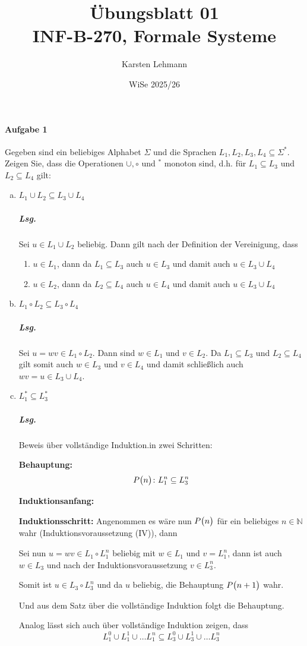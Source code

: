 \documentclass{scrreprt}
\author{Karsten Lehmann}
\date{WiSe 2025/26}
\title{Übungsblatt 01\\INF-B-270, Formale Systeme}
\begin{document}
\paragraph{Aufgabe 1}
Gegeben sind ein beliebiges Alphabet $\Sigma$ und die Sprachen
$L_1, L_2, L_3, L_4 \subseteq \Sigma^*$.
Zeigen Sie, dass die Operationen $\cup, \circ$ und $^*$ monoton sind, d.h.
für $L_1 \subseteq L_3$ und $L_2 \subseteq L_4$ gilt:
\begin{enumerate}[(a)]
\item $L_1 \cup L_2 \subseteq L_3 \cup L_4$

  \subparagraph{Lsg.} Sei $u \in L_1 \cup L_2$ beliebig.
  Dann gilt nach der Definition der Vereinigung, dass
  \begin{enumerate}[(1)]
  \item $u \in L_1$, dann da $L_1 \subseteq L_3$ auch $u \in L_3$ und damit
    auch $u \in L_3 \cup L_4$
  \item $u \in L_2$, dann da $L_2 \subseteq L_4$ auch $u \in L_4$ und damit
    auch $u \in L_3 \cup L_4$
  \end{enumerate}

\item $L_1 \circ L_2 \subseteq L_3 \circ L_4$

  \subparagraph{Lsg.} Sei $u = wv \in L_1 \circ L_2$.
  Dann sind $w \in L_1$ und $v \in L_2$.
  Da $L_1 \subseteq L_3$ und $L_2 \subseteq L_4$ gilt somit auch
  $w \in L_3$ und $v \in L_4$ und damit schließlich auch
  $wv = u \in L_3 \cup L_4$.
\item $L_1^* \subseteq L_3^*$

  \subparagraph{Lsg.} Beweis über vollständige Induktion.in zwei Schritten:

  \textbf{Behauptung:}
  \[
    P\qty\big(n) \colon L_1^n  \subseteq L_3^n
  \]

  \textbf{Induktionsanfang:}

  \textbf{Induktionsschritt:} Angenommen es wäre nun $P\qty\big(n)$ für ein
  beliebiges $n \in \mathbb{N}$ wahr (Induktionsvoraussetzung (IV)), dann
  Sei nun $u = wv \in L_1 \circ L_1^n$ beliebig mit $w \in L_1$ und $v = L_1^n$,
  dann ist auch $w \in L_3$ und nach der Induktionsvoraussetzung $v \in L_3^n$.

  Somit ist $u \in L_3 \circ L_3^n$ und da $u$ beliebig, die Behauptung
  $P\qty\big(n + 1)$ wahr.

  Und aus dem Satz über die vollständige Induktion folgt die Behauptung.

  Analog lässt sich auch über vollständige Induktion zeigen, dass
  \[
    L_1^0 \cup L_1^1 \cup \ldots L_1^n \subseteq L_3^0 \cup L_3^1 \cup \ldots L_3^n
  \]

\end{enumerate}
\end{document}
